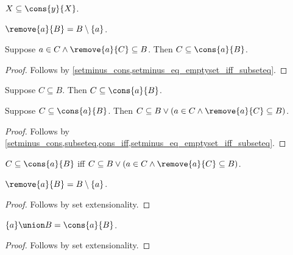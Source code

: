 \begin{corollary}\label{subseteq_cons_self}
    $X\subseteq \cons{y}{X}$.
\end{corollary}

\begin{abbreviation}\label{remove_point}
    $\remove{a}{B} = B\setminus\{a\}$.
\end{abbreviation}

\begin{proposition}\label{subseteq_cons_intro_left}
    Suppose $a\in C \land \remove{a}{C} \subseteq B$.
    Then $C\subseteq \cons{a}{B}$.
\end{proposition}
\begin{proof}
    Follows by \cref{setminus_cons,setminus_eq_emptyset_iff_subseteq}.
\end{proof}

\begin{proposition}\label{subseteq_cons_intro_right}
    Suppose $C \subseteq B$.
    Then $C\subseteq \cons{a}{B}$.
\end{proposition}

\begin{proposition}\label{subseteq_cons_elim}
    Suppose $C\subseteq \cons{a}{B}$.
    Then $C\subseteq B \lor (a\in C \land \remove{a}{C} \subseteq B)$.
\end{proposition}
\begin{proof}
    Follows by \cref{setminus_cons,subseteq,cons_iff,setminus_eq_emptyset_iff_subseteq}.
\end{proof}

\begin{proposition}\label{subseteq_cons_iff}
    $C\subseteq \cons{a}{B}$ iff $C\subseteq B \lor (a\in C \land \remove{a}{C}\subseteq B)$.
\end{proposition}


\begin{proposition}\label{remove_point_eq_setminus_singleton}
    $\remove{a}{B} = B\setminus\{a\}$.
\end{proposition}
\begin{proof}
    Follows by set extensionality.
\end{proof}


\begin{proposition}\label{union_eq_cons}
    $\{a\}\union B = \cons{a}{B}$.
\end{proposition}
\begin{proof}
    Follows by set extensionality.
\end{proof}

